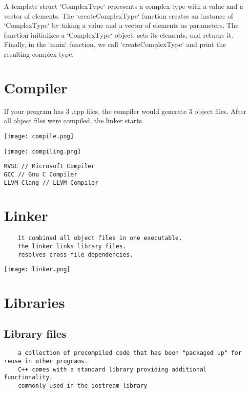 \documentclass[openany]{report}
\begin{document}
A template struct `ComplexType` represents a complex type with a value and a vector of elements. 
The `createComplexType` function creates an instance of `ComplexType` by taking a value and a vector of elements
as parameters. The function initializes a `ComplexType` object, sets its elements, and returns it. 
Finally, in the `main` function, we call `createComplexType` and print the resulting complex type.

\section{Compiler}

If your program has 3 .cpp files, the compiler would generate 3 object files. 
After all object files were compiled, the linker starts. 
\begin{center}
\texttt{[image: compile.png]}
\end{center}
\begin{center}
\texttt{[image: compiling.png]}
\end{center}

\begin{verbatim}
MVSC // Microsoft Compiler
GCC // Gnu C Compiler
LLVM Clang // LLVM Compiler
\end{verbatim}

\section{Linker}
\begin{verbatim}
    It combined all object files in one executable.
    the linker links library files. 
    resolves cross-file dependencies.  
\end{verbatim}

\begin{center}
\texttt{[image: linker.png]}
\end{center}
\section{Libraries}
\subsection{Library files}
\begin{verbatim}
    a collection of precompiled code that has been "packaged up" for reuse in other programs. 
    C++ comes with a standard library providing additional functionality.
    commonly used in the iostream library
\end{verbatim}
\end{document}

